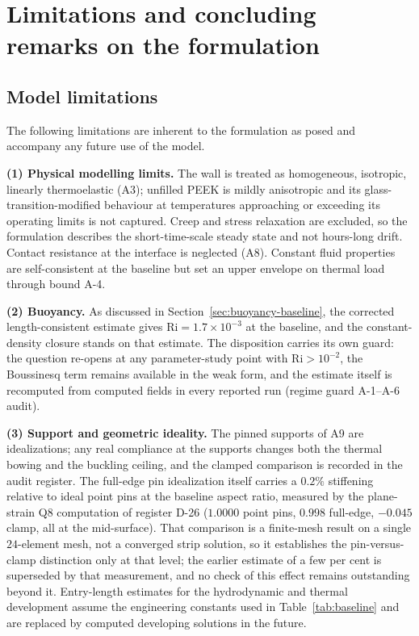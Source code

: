 \chapter{Limitations and concluding remarks on the formulation}
\label{ch:limitations}

\section{Model limitations}
\label{sec:limitations}
The following limitations are inherent to the formulation as posed and accompany any future use of
the model.

\textbf{(1) Physical modelling limits.} The wall is treated as homogeneous, isotropic, linearly
thermoelastic (A3); unfilled PEEK is mildly anisotropic and its glass-transition-modified behaviour
at temperatures approaching or exceeding its operating limits is not captured. Creep and
stress relaxation are excluded, so the formulation describes the short-time-scale steady state and
not hours-long drift. Contact resistance at the interface is neglected (A8). Constant fluid
properties are self-consistent at the baseline but set an upper envelope on thermal load through
bound A-4.

\textbf{(2) Buoyancy.} As discussed in Section~\ref{sec:buoyancy-baseline}, the corrected
length-consistent estimate gives $\mathrm{Ri}=1.7\times10^{-3}$ at the baseline, and the
constant-density closure stands on that estimate. The disposition carries its own guard: the
question re-opens at any parameter-study point with $\mathrm{Ri}>10^{-2}$, the Boussinesq term
remains available in the weak form, and the estimate itself is recomputed from computed fields in
every reported run (regime guard A-1--A-6 audit).

\textbf{(3) Support and geometric ideality.} The pinned supports of A9 are idealizations; any real
compliance at the supports changes both the thermal bowing and the buckling ceiling, and the
clamped comparison is recorded in the audit register. The full-edge pin idealization itself
carries a $0.2\%$ stiffening relative to ideal point pins at the baseline aspect ratio, measured by
the plane-strain Q8 computation of register D-26 ($1.0000$ point pins, $0.998$ full-edge, $-0.045$
clamp, all at the mid-surface). That comparison is a finite-mesh result on a single $24$-element mesh, not a
converged strip solution, so it establishes the pin-versus-clamp distinction only at that level; the
earlier estimate of a few per cent is superseded by that measurement, and no check of this effect
remains outstanding beyond it. Entry-length estimates for the hydrodynamic
and thermal development assume the engineering constants used in
Table~\ref{tab:baseline} and are replaced by computed developing solutions in the future.

